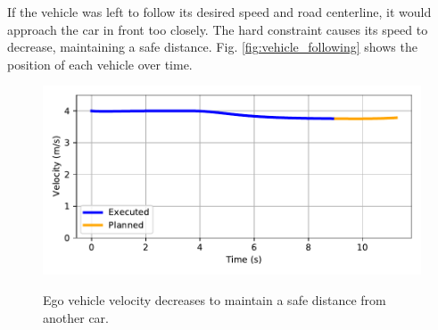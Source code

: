 \documentclass[letterpaper, 10 pt, conference]{ieeeconf}  %
\begin{document}
If the vehicle was left to follow its desired speed and road centerline, it would approach the car in front too closely. The hard constraint causes its speed to decrease, maintaining a safe distance. Fig. \ref{fig:vehicle_following} shows the position of each vehicle over time.
 
 \begin{figure}[h!]
	\centering
	\includegraphics[width=0.8\linewidth]{figures/vehicle_following_velocity.pdf}
	\label{fig:vehicle_following_velocity}
	\caption{Ego vehicle velocity decreases to maintain a safe distance from another car.}
\end{figure}
\end{document}

